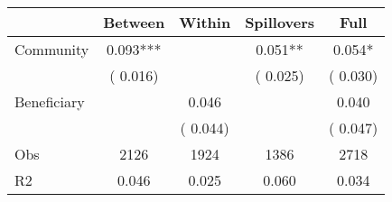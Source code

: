 
\begin{tabular}{l*{4}{c}}\hline&\multicolumn{1}{c}{Between}&\multicolumn{1}{c}{Within}&\multicolumn{1}{c}{Spillovers}&\multicolumn{1}{c}{Full}\\ \hline
 Community             &              0.093***      &                                               &        0.051** &         0.054*                            \\ 
                               &        (       0.016)           &                                       &       (       0.025)     &      (       0.030)                                           \\ 
 Beneficiary   &                                               &        0.046    &                                &             0.040                            \\ 
                               &                                               & (       0.044)                  &                                        &      (       0.047)                                           \\ 
\hline                                                                                                                                                                                                                                            
 Obs                   &               2126               &       1924                       &       1386                &              2718                                               \\ 
 R2                    &                      0.046              &              0.025                      &              0.060               &                     0.034                                              \\ 
\hline \end{tabular}                                                                                                                                                                                                              